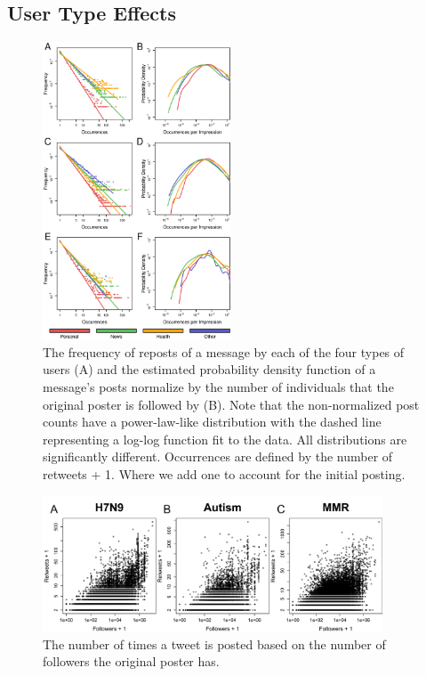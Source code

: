 \subsection{User Type Effects}
\begin{figure}
\centering
\includegraphics[width=0.5\textwidth]{retweets/figures/density_by_type.eps}
\caption{The frequency of reposts of a message by each of the four types of users (A) and the estimated probability density function of a message's posts normalize by the number of individuals that the original poster is followed by (B). Note that the non-normalized post counts have a power-law-like distribution with the dashed line representing a log-log function fit to the data. All distributions are significantly different. Occurrences are defined by the number of retweets + 1. Where we add one to account for the initial posting.}
\label{fig:type_density}
\end{figure}


\begin{figure}
\centering
\includegraphics[width=0.9\textwidth]{retweets/figures/retweet_followers.png}
\caption{The number of times a tweet is posted based on the number of followers the original poster has.}
\label{fig:retweet_followers}
\end{figure}


